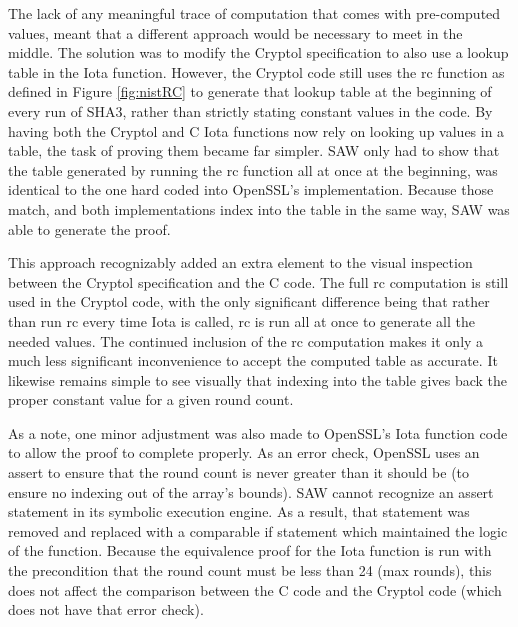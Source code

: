 The lack of any meaningful trace of computation that comes with pre-computed values, meant that a different approach would be necessary to meet in the middle.
The solution was to modify the Cryptol specification to also use a lookup table in the Iota function.
However, the Cryptol code still uses the rc function as defined in Figure \ref{fig:nistRC} to generate that lookup table at the beginning of every run of SHA3, rather than strictly stating constant values in the code.
By having both the Cryptol and C Iota functions now rely on looking up values in a table, the task of proving them became far simpler.
SAW only had to show that the table generated by running the rc function all at once at the beginning, was identical to the one hard coded into OpenSSL's implementation.
Because those match, and both implementations index into the table in the same way, SAW was able to generate the proof.

This approach recognizably added an extra element to the visual inspection between the Cryptol specification and the C code.
The full rc computation is still used in the Cryptol code, with the only significant difference being that rather than run rc every time Iota is called, rc is run all at once to generate all the needed values.
The continued inclusion of the rc computation makes it only a much less significant inconvenience to accept the computed table as accurate. 
It likewise remains simple to see visually that indexing into the table gives back the proper constant value for a given round count.

As a note, one minor adjustment was also made to OpenSSL's Iota function code to allow the proof to complete properly.
As an error check, OpenSSL uses an assert to ensure that the round count is never greater than it should be (to ensure no indexing out of the array's bounds).
SAW cannot recognize an assert statement in its symbolic execution engine.
As a result, that statement was removed and replaced with a comparable if statement which maintained the logic of the function.
Because the equivalence proof for the Iota function is run with the precondition that the round count must be less than 24 (max rounds), this does not affect the comparison between the C code and the Cryptol code (which does not have that error check).

